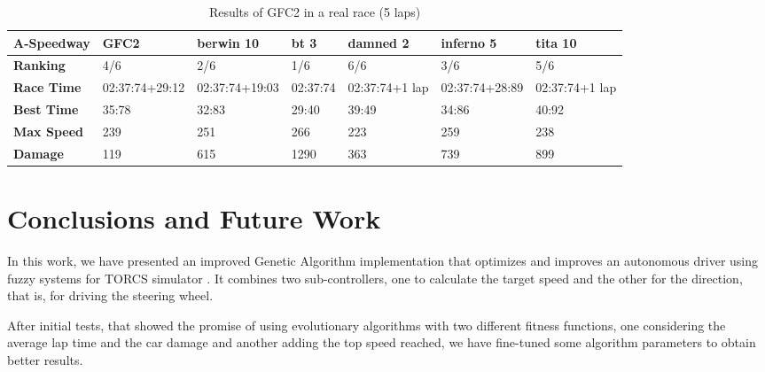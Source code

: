 \documentclass[sigconf]{acmart}
\begin{document}
\begin{table}[!ht]
	\centering
	{\scriptsize
		\caption{Results of GFC2 in a real race (5 laps)}
		\label{tab:gfc2real2}
		\begin{tabular}{|p{2 cm}|p{1.5 cm}|p{1.5 cm}|p{1.5 cm}|p{1.5 cm}|p{1.5 cm}|p{1.5 cm}|}
			\hline \textbf{A-Speedway} & \textbf{GFC2}&\textbf{berwin 10} & \textbf{bt 3} &\textbf{damned 2} & \textbf{inferno 5} & \textbf{tita 10}  \\
			\hline \textbf{Ranking} & 4/6&2/6&1/6&6/6&3/6&5/6\\			
			\hline \textbf{Race Time}	& 02:37:74\newline +29:12&  02:37:74\newline +19:03&02:37:74&02:37:74\newline+1 lap&02:37:74\newline+28:89&02:37:74\newline+1 lap\\	
			\hline \textbf{Best Time}& 35:78 &32:83&29:40&39:49&34:86&40:92\\	
			\hline \textbf{Max Speed}& 239&251&266&223&259&238\\	
			\hline \textbf{Damage}& 119& 615&1290 &363&739&899\\	
			\hline 
		\end{tabular}
	}
\end{table} 


\section{Conclusions and Future Work} 
\label{sec:conclusions}

In this work, we have presented an improved Genetic Algorithm implementation that optimizes and improves an autonomous driver using fuzzy systems for TORCS simulator \cite{evo17}. It combines two sub-controllers, one to calculate the target speed and the other for the direction, that is, for driving the steering wheel.

After initial tests, that showed the promise of using evolutionary algorithms with two different fitness functions, one considering the average lap time and the car damage and another adding the top speed reached, we have fine-tuned some algorithm parameters to obtain better results. %
\end{document}
